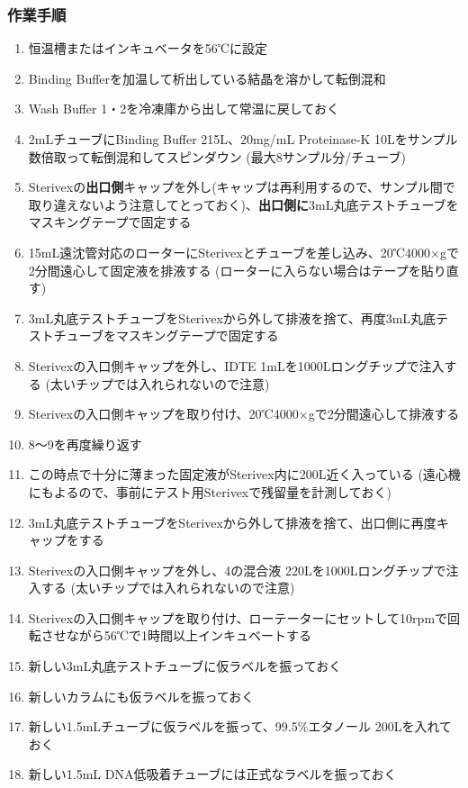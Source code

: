 \documentclass[titlepage,10pt,a4paper,uplatex]{jsbook}
\renewcommand{\textbf}[1]{{\bfseries\sffamily#1}}
\begin{document}
\subsubsection{作業手順}
\begin{enumerate}
\item 恒温槽またはインキュベータを56℃に設定
\item Binding Bufferを加温して析出している結晶を溶かして転倒混和
\item Wash Buffer 1・2を冷凍庫から出して常温に戻しておく
\item 2mLチューブにBinding Buffer 215{\textmu}L、20mg/mL Proteinase-K 10{\textmu}Lをサンプル数倍取って転倒混和してスピンダウン (最大8サンプル分/チューブ)
\item Sterivexの\textbf{出口側}キャップを外し(キャップは再利用するので、サンプル間で取り違えないよう注意してとっておく)、\textbf{出口側に}3mL丸底テストチューブをマスキングテープで固定する
\item 15mL遠沈管対応のローターにSterivexとチューブを差し込み、20℃4000×gで2分間遠心して固定液を排液する (ローターに入らない場合はテープを貼り直す)
\item 3mL丸底テストチューブをSterivexから外して排液を捨て、再度3mL丸底テストチューブをマスキングテープで固定する
\item Sterivexの入口側キャップを外し、IDTE 1mLを1000{\textmu}Lロングチップで注入する (太いチップでは入れられないので注意)
\item Sterivexの入口側キャップを取り付け、20℃4000×gで2分間遠心して排液する
\item 8～9を再度繰り返す
\item この時点で十分に薄まった固定液がSterivex内に200{\textmu}L近く入っている (遠心機にもよるので、事前にテスト用Sterivexで残留量を計測しておく)
\item 3mL丸底テストチューブをSterivexから外して排液を捨て、出口側に再度キャップをする
\item Sterivexの入口側キャップを外し、4の混合液 220{\textmu}Lを1000{\textmu}Lロングチップで注入する (太いチップでは入れられないので注意)
\item Sterivexの入口側キャップを取り付け、ローテーターにセットして10rpmで回転させながら56℃で1時間以上インキュベートする
\item 新しい3mL丸底テストチューブに仮ラベルを振っておく
\item 新しいカラムにも仮ラベルを振っておく
\item 新しい1.5mLチューブに仮ラベルを振って、99.5\%エタノール 200{\textmu}Lを入れておく
\item 新しい1.5mL DNA低吸着チューブには正式なラベルを振っておく

\end{enumerate}
\end{document}
